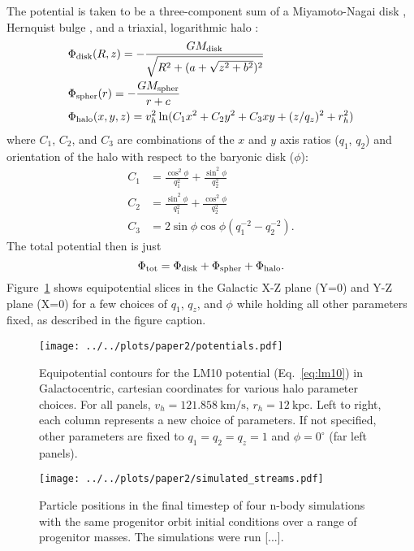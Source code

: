 \documentclass[letterpaper,12pt,preprint]{aastex}
\begin{document}
The potential is taken to be a three-component sum of a Miyamoto-Nagai disk \citep{}, Hernquist bulge \citep[spheroid;][]{}, and a triaxial, logarithmic halo \citep[e.g.,][]{law10}:
\begin{align}
	&\Phi_{\rm disk}(R,z) = -\frac{GM_{\rm disk}}{\sqrt{R^2 + (a + \sqrt{z^2 + b^2})^2}}\\
	&\Phi_{\rm spher}(r) = -\frac{GM_{\rm spher}}{r + c}\\
	&\Phi_{\rm halo}(x,y,z) = v_{h}^2 \ln(C_1 x^2 + C_2 y^2 + C_3 xy + (z/q_z)^2 + r_h^2)
\end{align}
where $C_1$, $C_2$, and $C_3$ are combinations of the $x$ and $y$ axis
ratios ($q_1$, $q_2$) and orientation of the halo with respect to the
baryonic disk ($\phi$):
\begin{align}
  C_1 &= \frac{\cos^2\phi}{q_1^2} + \frac{\sin^2\phi}{q_2^2}\\
  C_2 &= \frac{\sin^2\phi}{q_1^2} + \frac{\cos^2\phi}{q_2^2}\\
  C_3 &= 2\sin\phi\cos\phi \left(q_1^{-2} - q_2^{-2}\right).
\end{align}
The total potential then is just
\begin{equation}
	\Phi_{\rm tot} = \Phi_{\rm disk} + \Phi_{\rm spher} + \Phi_{\rm halo}\label{eq:lm10}.
\end{equation}
Figure~\ref{fig:potential} shows equipotential slices in the Galactic X-Z plane (Y=0) and Y-Z plane (X=0) for a few choices of  $q_1$,  $q_z$, and $\phi$ while holding all other parameters fixed, as described in the figure caption.

\begin{figure}[h]
\begin{center}
\texttt{[image: ../../plots/paper2/potentials.pdf]}
\caption{ Equipotential contours for the LM10 potential (Eq.~\ref{eq:lm10}) in Galactocentric, cartesian coordinates for various halo parameter choices. For all panels, $v_h=121.858~\mathrm{km}/\mathrm{s}$, $r_h=12~\mathrm{kpc}$. Left to right, each column represents a new choice of parameters. If not specified, other parameters are fixed to $q_1=q_2=q_z=1$ and $\phi=0^\circ$ (far left panels).  }\label{fig:potential}
\end{center}
\end{figure}

\begin{figure}[h]
\begin{center}
\texttt{[image: ../../plots/paper2/simulated\_streams.pdf]}
\caption{ Particle positions in the final timestep of four n-body simulations with the same progenitor orbit initial conditions over a range of progenitor masses. The simulations were run [...]. }\label{fig:sims}
\end{center}
\end{figure}
\end{document}
